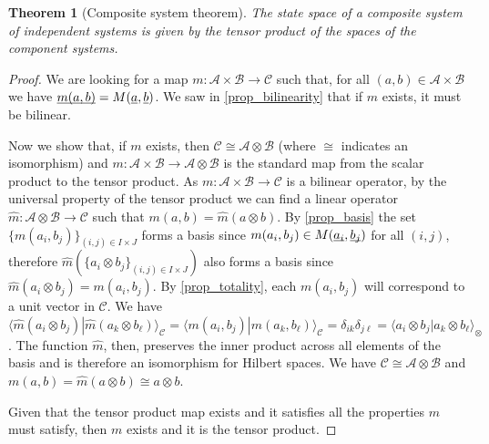 \documentclass[aps,prl,amsmath,amssymb,twocolumn,nofootinbib]{revtex4}
\theoremstyle{plain}
\newtheorem{thrm}{Theorem}[section]
\theoremstyle{definition}
\theoremstyle{remark}
\newcommand{\pj}[1] {\underbar{$#1$}}
\def\>{\rangle}
\def\<{\langle}
\begin{document}
	\begin{thrm}[Composite system theorem]\label{theo}
		The state space of a composite system of independent systems is given by the tensor product of the spaces of the component systems.
	\end{thrm}
	
	\begin{proof}
		We are looking for a map $m : \mathcal{A} \times \mathcal{B} \to \mathcal{C}$ such that, for all $(a,b) \in \mathcal{A} \times \mathcal{B}$ we have $\pj{m(a,b)} = M(\pj{a}, \pj{b})$. We saw in \ref{prop_bilinearity} that if $m$ exists, it must be bilinear.
		
		Now we show that, if $m$ exists, then $\mathcal{C} \cong \mathcal{A}
		\otimes \mathcal{B}$ (where $\cong$ indicates an isomorphism) and $m :
		\mathcal{A} \times \mathcal{B} \to \mathcal{A} \otimes \mathcal{B}$ is
		the standard map from the scalar product to the tensor product. As $m
		: \mathcal{A} \times \mathcal{B} \to \mathcal{C}$ is a bilinear
		operator, by the universal property of the tensor product we can find
		a linear operator $\hat{m} : \mathcal{A} \otimes \mathcal{B} \to
		\mathcal{C}$ such that $m(a, b) = \hat{m}(a \otimes b)$. By
		\ref{prop_basis} the set $\{ m(a_i, b_j)\}_{(i,j) \in I \times J}$
		forms a basis since $ m(a_i, b_j) \in M(\pj{a_i}, \pj{b_j})$ for all
		$(i, j)$, therefore $\hat{m}(\{ a_i \otimes b_j\}_{(i,j) \in I \times
			J})$ also forms a basis since $\hat{m}(a_i\otimes b_j)=m(a_i, b_j)$.
		By \ref{prop_totality}, each $m(a_i,b_j)$ will correspond to a unit
		vector in $\mathcal{C}$. We have $\<\hat m(a_i\otimes b_j)| \hat
		m(a_k\otimes b_\ell)\>_\mathcal{C} =\<m(a_i, b_j)| m(a_k,
		b_\ell)\>_\mathcal{C} = \delta_{ik}\delta_{j\ell} = \<a_i\otimes b_j|
		a_k \otimes b_\ell\>_{\otimes}$. The function $\hat{m}$, then,
		preserves the inner product across all elements of the basis and is
		therefore an isomorphism for Hilbert spaces. We have $\mathcal{C}
		\cong \mathcal{A} \otimes \mathcal{B}$ and $m(a, b) = \hat{m}(a
		\otimes b) \cong a \otimes b$.
		
		Given that the tensor product map exists and it satisfies all the properties $m$ must satisfy, then $m$ exists and it is the tensor product.
	\end{proof}
	
\end{document}
